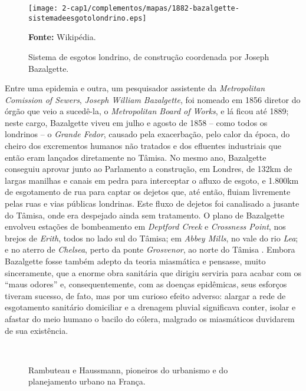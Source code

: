 \begin{figure}[!htp]
\centering
\texttt{[image: 2-cap1/complementos/mapas/1882-bazalgette-sistemadeesgotolondrino.eps]}{\par \footnotesize \textbf{Fonte:} Wikipédia. \par}
\label{fig:esgotoslondres1882} 
\caption{Sistema de esgotos londrino, de construção coordenada por Joseph Bazalgette.}
\end{figure}

Entre uma epidemia e outra, um pesquisador assistente da \textit{Metropolitan Comission of Sewers}, \textit{Joseph William Bazalgette}, foi nomeado em 1856 diretor do órgão que veio a sucedê-la, o \textit{Metropolitan Board of Works}, e lá ficou até 1889; neste cargo, Bazalgette viveu em julho e agosto de 1858 -- como todos os londrinos -- o \textit{Grande Fedor}, causado pela exacerbação, pelo calor da época, do cheiro dos excrementos humanos não tratados e dos efluentes industriais que então eram lançados diretamente no Tâmisa. No mesmo ano, Bazalgette conseguiu aprovar junto ao Parlamento a construção, em Londres, de 132km de largas manilhas e canais em pedra para interceptar o afluxo de esgoto, e 1.800km de esgotamento de rua para captar os dejetos que, até então, fluiam livremente pelas ruas e vias públicas londrinas. Este fluxo de dejetos foi canalisado a jusante do Tâmisa, onde era despejado ainda sem tratamento. O plano de Bazalgette envolveu estações de bombeamento em \textit{Deptford Creek} e \textit{Crossness Point}, nos brejos de \textit{Erith}, todos no lado sul do Tâmisa; em \textit{Abbey Mills}, no vale do rio \textit{Lea}; e no aterro de \textit{Chelsea}, perto da ponte \textit{Grosvenor}, ao norte do Tâmisa \cite{bazalgette_london_1865, bazalgette_metropolitan_1865}. Embora Bazalgette fosse também adepto da teoria miasmática e pensasse, muito sinceramente, que a enorme obra sanitária que dirigiu serviria para acabar com os ``maus odores'' e, consequentemente, com as doenças epidêmicas, seus esforços tiveram sucesso, de fato, mas por um curioso efeito adverso: alargar a rede de esgotamento sanitário domiciliar e a drenagem pluvial significava conter, isolar e afastar do meio humano o bacilo do cólera, malgrado os miasmáticos duvidarem de sua existência.

\begin{figure}[!htp]
\centering
{}
\  %
\caption{Rambuteau e Haussmann, pioneiros do urbanismo e do planejamento urbano na França.}
\end{figure}

